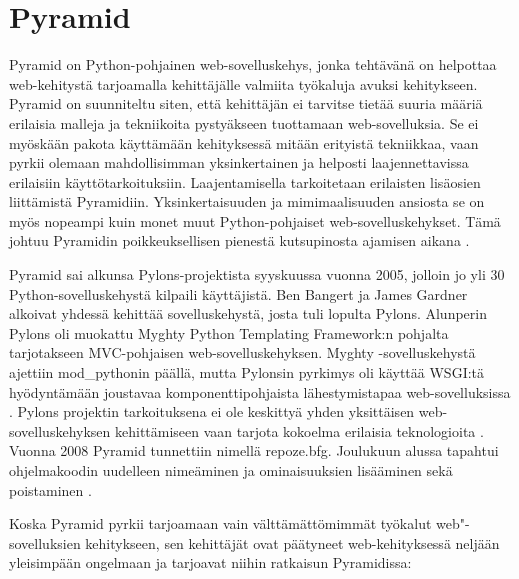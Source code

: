 \documentclass[utf8]{gradu3}
\begin{document}
\section{Pyramid}
Pyramid on Python-pohjainen web-sovelluskehys, jonka tehtävänä on helpottaa web-kehitystä tarjoamalla
kehittäjälle valmiita työkaluja avuksi kehitykseen. Pyramid on suunniteltu siten, että kehittäjän ei tarvitse tietää suuria määriä erilaisia malleja ja tekniikoita pystyäkseen tuottamaan web-sovelluksia. Se ei myöskään pakota käyttämään kehityksessä mitään erityistä tekniikkaa, vaan pyrkii olemaan mahdollisimman yksinkertainen ja helposti laajennettavissa erilaisiin käyttötarkoituksiin. Laajentamisella tarkoitetaan erilaisten lisäosien liittämistä Pyramidiin. Yksinkertaisuuden ja mimimaalisuuden ansiosta se on myös nopeampi kuin monet muut Python-pohjaiset web-sovelluskehykset. Tämä johtuu Pyramidin poikkeuksellisen pienestä kutsupinosta ajamisen aikana \parencite{pyramid_intr}. 

Pyramid sai alkunsa Pylons-projektista syyskuussa vuonna 2005, jolloin jo yli 30 Python-sovelluskehystä kilpaili käyttäjistä. Ben Bangert ja James Gardner alkoivat yhdessä kehittää sovelluskehystä, josta tuli lopulta Pylons. Alunperin Pylons oli
muokattu Myghty Python Templating Framework:n pohjalta tarjotakseen MVC-pohjaisen web-sovelluskehyksen. Myghty -sovelluskehystä ajettiin mod\_pythonin päällä, mutta Pylonsin pyrkimys oli käyttää WSGI:tä hyödyntämään joustavaa komponenttipohjaista lähestymistapaa web-sovelluksissa \parencite{pylons_history}. Pylons projektin tarkoituksena ei ole keskittyä yhden yksittäisen web-sovelluskehyksen kehittämiseen vaan tarjota kokoelma erilaisia teknologioita \parencite{pylons_about}. Vuonna 2008 Pyramid tunnettiin nimellä repoze.bfg. Joulukuun alussa tapahtui ohjelmakoodin uudelleen nimeäminen ja ominaisuuksien lisääminen sekä poistaminen \parencite{pyramid_about}.

Koska Pyramid pyrkii tarjoamaan vain välttämättömimmät työkalut web"-sovelluksien kehitykseen, sen kehittäjät
ovat päätyneet web-kehityksessä neljään yleisimpään ongelmaan ja tarjoavat niihin ratkaisun Pyramidissa:
\end{document}
